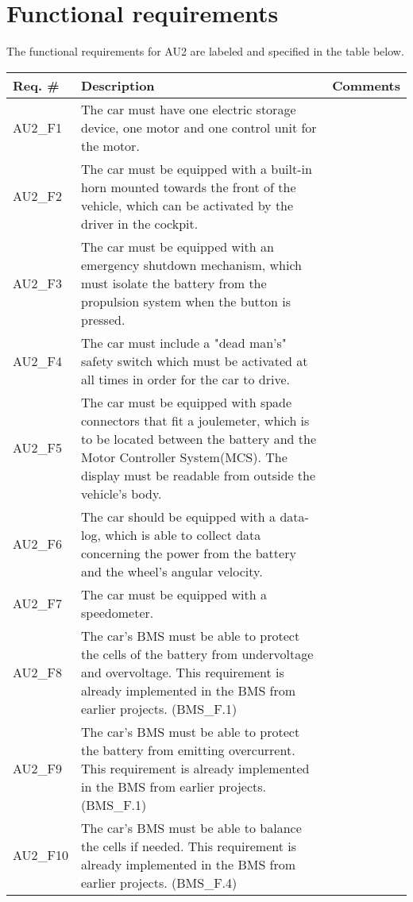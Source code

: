\section{Functional requirements}
The functional requirements for AU2 are labeled and specified in the table below.

\begin{longtable}{|p{2 cm}|p{7 cm}|p{4 cm}|}
		\hline
		\textbf{Req. \#} & \textbf{Description} & \textbf{Comments} \\\hline
		AU2\_F1		& The car must have one electric storage device, one motor and one control unit for the motor. &   \\\hline
		AU2\_F2		& The car must be equipped with a built-in horn mounted towards the front of the vehicle, which can be activated by the driver in the cockpit. &   \\\hline
		AU2\_F3		& The car must be equipped with an emergency shutdown mechanism, which must isolate the battery from the propulsion system when the button is pressed. &   \\\hline
		AU2\_F4		& The car must include a "dead man's" safety switch which must be activated at all times in order for the car to drive. &   \\\hline
		AU2\_F5	& The car must be equipped with spade connectors that fit a joulemeter, which is to be located between the battery and the Motor Controller System(MCS). The display must be readable from outside the vehicle's body. &   \\\hline
		AU2\_F6	& The car should be equipped with a data-log, which is able to collect data concerning the power from the battery and the wheel's angular velocity. &   \\\hline
		AU2\_F7	& The car must be equipped with a speedometer. &   \\\hline
		AU2\_F8	& The car's BMS must be able to protect the cells of the battery from undervoltage and overvoltage. This requirement is already implemented in the BMS from earlier projects. (BMS\_F.1) \fxnote{reference to 2013BMS Documentation} &   \\\hline
		AU2\_F9	& The car's BMS must be able to protect the battery from emitting overcurrent. This requirement is already implemented in the BMS from earlier projects. (BMS\_F.1) \fxnote{reference to 2013BMS Documentation} &   \\\hline
		AU2\_F10	& The car's BMS must be able to balance the cells if needed. This requirement is already implemented in the BMS from earlier projects. (BMS\_F.4) \fxnote{reference to 2013BMS Documentation} &   \\\hline

\end{longtable}
